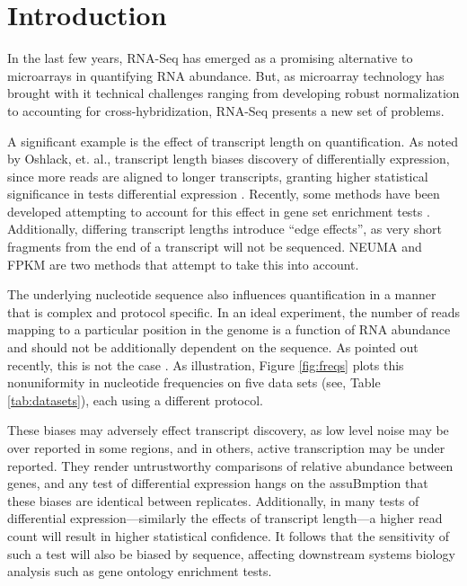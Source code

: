 \documentclass{bioinfo}
\begin{document}
\section{Introduction}

In the last few years, RNA-Seq has emerged as a promising alternative to
microarrays in quantifying RNA abundance. But, as microarray technology has
brought with it technical challenges ranging from developing robust
normalization to accounting for cross-hybridization, RNA-Seq presents a new set
of problems.

A significant example is the effect of transcript length on quantification.
As noted by Oshlack, et. al., transcript length biases discovery of differentially
expression, since more reads are aligned to longer transcripts, granting
higher statistical significance in tests differential expression
\cite{Oshlack2009}. Recently, some methods have been developed attempting to account for
this effect in gene set enrichment tests \cite{Young2010} \cite{Gao2011}.
Additionally, differing transcript lengths introduce ``edge
effects'', as very short fragments from the end of a transcript will not be
sequenced. NEUMA \cite{Lee2010} and FPKM \cite{Trapnell2010} are two methods
that attempt to take this into account.

The underlying nucleotide sequence also influences quantification in a manner
that is complex and protocol specific. In an ideal experiment, the number of
reads mapping to a particular position in the genome is a function of RNA
abundance and should not be additionally dependent on the sequence. As pointed
out recently, this is not the case \cite{Dohm2008} \cite{Li2010}
\cite{Hansen2010}. As illustration, Figure \ref{fig:freqs} plots this
nonuniformity in nucleotide frequencies on five data sets (see, Table
\ref{tab:datasets}), each using a different protocol.


These biases may adversely effect transcript discovery, as low level noise may
be over reported in some regions, and in others, active transcription may be
under reported. They render untrustworthy comparisons of relative abundance
between genes, and any test of differential expression hangs on the assuBmption
that these biases are identical between replicates.  Additionally, in many tests
of differential expression---similarly the effects of transcript length---a higher
read count will result in higher statistical confidence. It follows that the
sensitivity of such a test will also be biased by sequence, affecting downstream
systems biology analysis such as gene ontology enrichment tests.
\end{document}
